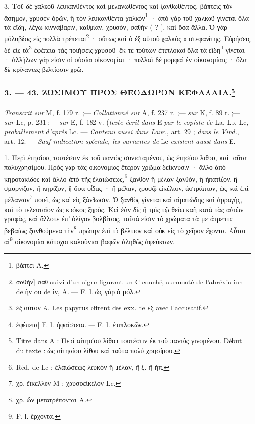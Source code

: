 \documentclass[landscape, a4paper, 11pt, oneside, polutonikogreek, french]{article}
\begin{document}
3. Τοῦ δὲ χαλκοῦ λευκανθέντος καὶ μελανωθέντος καὶ ξανθωθέντος, βάπτεις τὸν ἄσημον, χρυσὸν ὁρῶν, ἢ τὸν λευκανθέντα χαλκόν\footnote{βάπτει A.} · ἀπὸ γὰρ τοῦ χαλκοῦ γίνεται ὅλα τὰ εἴδη, λέγω κιννάβαριν, καθμίαν, χρυσὸν, σαθὴν ( ? ), καὶ ὅσα ἄλλα. Ὁ γὰρ μόλυβδος εἰς πολλὰ τρέπεται\footnote{σαθὴν] σαθ suivi d'un signe figurant un C couché, surmonté de l'abréviation de ὴν ou de ὶν, A. --- F. l. ὡς γὰρ ὁ μόλ.} · οὕτως καὶ ὁ ἐξ αὐτοῦ χαλκὸς ὁ στεφανίτης. Εὑρήσεις δὲ εἰς τὰ\footnote{ἐξ αὐτὸν A. Les papyrus offrent des exx. de ἐξ avec l'accusatif.} ἐφέπεια τὰς ποιήσεις χρυσοῦ, ἔκ τε τούτων ἐπιπλοκαὶ ὅλα τὰ εἴδη\footnote{ἐφέπεια] F. l. ἡφαίστεια. --- F. l. ἐπιπλοκῶν.} γίνεται · ἀλλήλων γάρ εἰσιν αἱ οὐσίαι οἰκονομίαι · πολλαὶ δὲ μορφαὶ ἐν οἰκονομίαις · ὅλα δὲ κρίναντες βελτίοσιν χρῶ.

\bigskip
\centerline{\EightStarTaper}
\centerline{\EightStarTaper\EightStarTaper}
\bigskip

\subsubsection[3. --- 43. ΖΩΣΙΜΟΥ ΠΡΟΣ ΘΕΟΔΩΡΟΝ ΚΕΦΑΛΑΙΑ.]{3. --- 43. ΖΩΣΙΜΟΥ ΠΡΟΣ ΘΕΟΔΩΡΟΝ ΚΕΦΑΛΑΙΑ.\footnote{Titre dans A : Περὶ αἰτησίου λίθου τουτέστιν ἐκ τοῦ παντὸς γινομένου. Début du texte : ὡς αἰτησίου λίθου καὶ ταῦτα πολὐ χρησίμου.}}
\paragraph{}
\emph{Transcrit sur} M, f. 179 r. ;--- \emph{Collationné sur} A, f. 237 r. ;--- \emph{sur} K, f. 89 r. ;--- \emph{sur} Lc, p. 231 ;--- \emph{sur} E, f. 182 v. (\emph{texte écrit dans} E \emph{par le copiste de} La, Lb, Lc, \emph{probablement d'après} Lc. --- \emph{Contenu aussi dans Laur.}, art. 29 ; \emph{dans le Vind.}, art. 12. --- \emph{Sauf indication spéciale, les variantes de} Lc \emph{existent aussi dans} E.

\bigskip

1. Περὶ ἐτησίου, τουτέστιν ἐκ τοῦ παντὸς συνισταμένου, ὡς ἐτησίου λιθου, καὶ ταῦτα πολυχρησίμου. Πρὸς γὰρ τὰς οἱκονομίας ἕτερον χρῶμα δείκνυσιν · ἄλλο ἀπὸ κηροτακίδος καὶ ἄλλο ἀπὸ τῆς ἐλαιώσεως,\footnote{Réd. de Lc : ἐλαιώσεως λευκὸν ἢ μέλαν, ἢ ξ. ἢ ἡπ.} ξανθὸν ἢ μέλαν ξανθὸν, ἢ ἡπατίζον, ἢ σμυρνίζον, ἢ κηρίζον, ἢ ὅσα οἶδας · ἢ μέλαν, χρυσῷ εἰκέλιον, ἀστράπτον, ὡς καὶ ἐπὶ μέλανσιν\footnote{χρ. ἐϊκελλον M ; χρυσοείκελον Lc.} ποιεῖ, ὡς καὶ εἰς ξάνθωσιν. Ὁ ξανθὸς γίνεται καὶ αἱματώδης καὶ ἀρραγὴς, καὶ τὸ τελευταῖον ὡς κρόκος ξηρὸς. Καὶ ἐὰν δὶς ἢ τρὶς τῷ θείῳ καῇ κατὰ τὰς αὐτῶν γραφὰς, καὶ ἄλλοτε ἐπ' ὀλίγον βολβίτοις, ταῦτά εἰσιν τὰ χρώματα τὰ μετάτρεπτα βεβαίως ξανθούμενα τὴν\footnote{χρ. ὧν μετατρέπονται A.} πρώτην ἐπὶ τὸ βέλτιον καὶ οὐκ εἰς τὸ χεῖρον ἔχοντα. Αὗται αἱ\footnote{F. l. ἔρχοντα.} οἰκονομίαι κάτοχοι καλοῦνται βαφῶν ἀληθῶς ἀφεύκτων.
\end{document}
